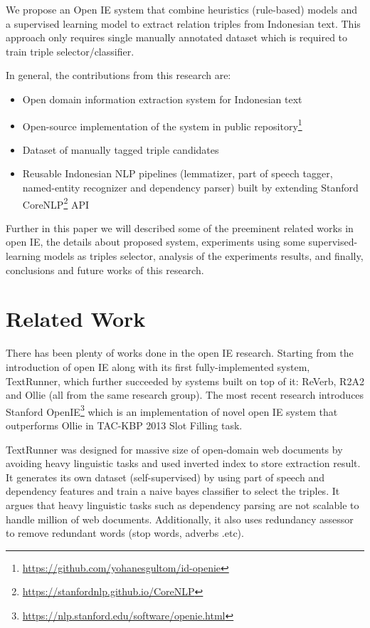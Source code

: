 \documentclass[conference,compsoc]{IEEEtran}
\begin{document}
We propose an Open IE system that combine heuristics (rule-based) models and a supervised learning model to extract relation triples from Indonesian text. This approach only requires single manually annotated dataset which is required to train triple selector/classifier. 

In general, the contributions from this research are:

\begin{itemize}
\item Open domain information extraction system for Indonesian text
\item Open-source implementation of the system in public repository\footnote{\url{https://github.com/yohanesgultom/id-openie}}
\item Dataset of manually tagged triple candidates
\item Reusable Indonesian NLP pipelines (lemmatizer, part of speech tagger, named-entity recognizer and dependency parser) built by extending Stanford CoreNLP\footnote{\url{https://stanfordnlp.github.io/CoreNLP}} API
\end{itemize}

Further in this paper we will described some of the preeminent related works in open IE, the details about proposed system, experiments using some supervised-learning models as triples selector, analysis of the experiments results, and finally, conclusions and future works of this research.

\section{Related Work}

There has been plenty of works done in the open IE research. Starting from the introduction of open IE along with its first fully-implemented system, TextRunner, which further succeeded by systems built on top of it: ReVerb, R2A2 and Ollie (all from the same research group). The most recent research introduces Stanford OpenIE\footnote{\url{https://nlp.stanford.edu/software/openie.html}} which is an implementation of novel open IE system that outperforms Ollie in TAC-KBP
2013 Slot Filling task\cite{angeli2015leveraging}.

TextRunner was designed for massive size of open-domain web documents by avoiding heavy linguistic tasks and used inverted index to store extraction result\cite{banko2007open}. It generates its own dataset (self-supervised) by using part of speech and dependency features and train a naive bayes classifier to select the triples. It argues that heavy linguistic tasks such as dependency parsing are not scalable to handle million of web documents. Additionally, it also uses redundancy assessor to remove redundant words (stop words, adverbs .etc).
\end{document}
